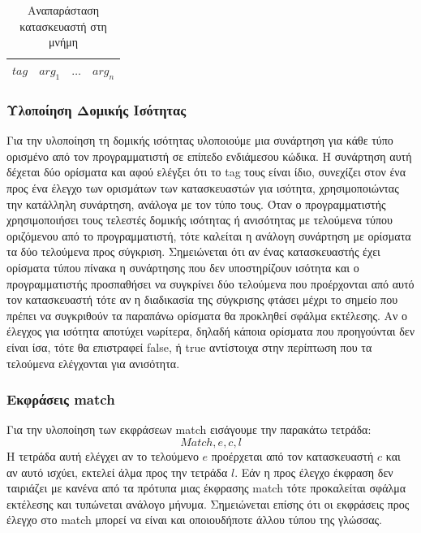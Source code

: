 \documentclass[12pt]{article}
\begin{document}
\begin{table}[htbp]
\centering
    \begin{tabular}{|l|c|l|l|}
    \hline
    $tag$ & $arg_1$ & $\ldots$ & $arg_n$ \\ \hline
    \end{tabular}
    \caption{Αναπαράσταση κατασκευαστή στη μνήμη}
\end{table}

\subsubsection{Υλοποίηση Δομικής Ισότητας}
Για την υλοποίηση τη δομικής ισότητας υλοποιούμε μια συνάρτηση για κάθε τύπο ορισμένο από τον προγραμματιστή σε επίπεδο ενδιάμεσου κώδικα. Η συνάρτηση αυτή δέχεται δύο ορίσματα και αφού ελέγξει ότι το tag τους είναι ίδιο, συνεχίζει στον ένα προς ένα έλεγχο των ορισμάτων των κατασκευαστών για ισότητα, χρησιμοποιώντας την κατάλληλη συνάρτηση, ανάλογα με τον τύπο τους. Όταν ο προγραμματιστής χρησιμοποιήσει τους τελεστές δομικής ισότητας ή ανισότητας με τελούμενα τύπου οριζόμενου από το προγραμματιστή, τότε καλείται η ανάλογη συνάρτηση με ορίσματα τα δύο τελούμενα προς σύγκριση. 
Σημειώνεται ότι αν ένας κατασκευαστής έχει ορίσματα τύπου πίνακα η συνάρτησης που δεν υποστηρίζουν ισότητα και ο προγραμματιστής προσπαθήσει να συγκρίνει δύο τελούμενα που προέρχονται από αυτό τον κατασκευαστή τότε αν η διαδικασία της σύγκρισης φτάσει μέχρι το σημείο που πρέπει να συγκριθούν τα παραπάνω ορίσματα θα προκληθεί σφάλμα εκτέλεσης. Αν ο έλεγχος για ισότητα αποτύχει νωρίτερα, δηλαδή κάποια ορίσματα που προηγούνται δεν είναι ίσα, τότε θα επιστραφεί false, ή true αντίστοιχα στην περίπτωση που τα τελούμενα ελέγχονται για ανισότητα.
  
  
\subsubsection{Εκφράσεις match}
Για την υλοποίηση των εκφράσεων match εισάγουμε την παρακάτω τετράδα:
$$ Match, e, c, l$$
Η τετράδα αυτή ελέγχει αν το τελούμενο $e$ προέρχεται από τον κατασκευαστή $c$ και αν αυτό ισχύει, εκτελεί άλμα προς την τετράδα $l$.  Εάν η προς έλεγχο έκφραση δεν ταιριάζει με κανένα από τα πρότυπα μιας έκφρασης match τότε προκαλείται σφάλμα εκτέλεσης και τυπώνεται ανάλογο μήνυμα. Σημειώνεται επίσης ότι οι εκφράσεις προς έλεγχο στο match μπορεί να είναι και οποιουδήποτε άλλου τύπου της γλώσσας. 
\end{document}
